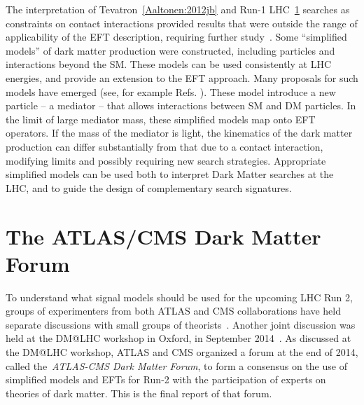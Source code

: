 The interpretation of Tevatron~\ref{Aaltonen:2012jb} and Run-1 LHC~\ref{} searches
as constraints on contact interactions
provided results that were outside the range of applicability of the EFT
description, requiring further study~\cite{Bai:2010hh,Kopp:2011eu,Fox:2011fx,Fox:2011pm,Shoemaker:2011vi,Busoni:2013lha}.
Some ``simplified models'' \cite{Alwall:2008ag,Goodman:2011jq,Alves:2011wf}
of dark matter production were constructed, including particles and interactions beyond the SM.
These models can be used consistently at LHC energies, and provide
an extension to the EFT approach. 
Many proposals for such models have emerged (see, for example
Refs. \cite{An:2012va,An:2012ue,Tait:2013,Buchmueller:2013dya,Bai:2013iqa,Bai:2014osa,An:2013xka,Yavin:14092893,Malik:2014ggr,Harris:2014hga,Buckley:2014fba,Haisch:2015ioa,Bai:2012xg,Carpenter:2012rg,Bell:2012rg,Petrov:2013nia,Carpenter:2013xra}). 
These model introduce a new particle -- a mediator -- that allows
interactions between SM and DM particles.
In the limit of large mediator mass, these simplified models map onto
EFT operators.
If the mass of the mediator is light, the kinematics of the
dark matter production can differ substantially from that due to a contact
interaction, modifying limits and possibly requiring new search strategies.
Appropriate simplified models can be used both to
interpret Dark Matter searches at the LHC, and to guide the design of complementary
search signatures.

\section{The ATLAS/CMS Dark Matter Forum}

To understand what signal models should be used for the upcoming LHC Run 2, groups of experimenters from 
both ATLAS and CMS collaborations have held separate discussions with small groups of
theorists~\cite{Malik:2014ggr,Yavin:14092893}. 
Another joint discussion was held at the DM@LHC workshop in Oxford, in 
September 2014~\cite{DMatLHCProceedings}. 
As discussed at the DM@LHC workshop, ATLAS and CMS organized a forum at the
end of 2014, called the~\textit{ATLAS-CMS Dark
Matter Forum}, to form a consensus on the use of simplified models
and EFTs for Run-2 with the participation of experts on
theories of dark matter. This is the final report of that forum.

